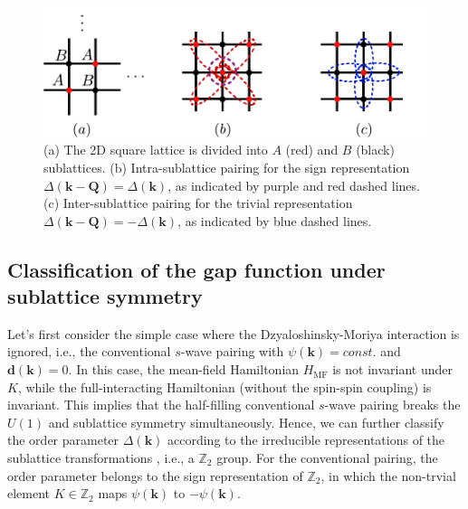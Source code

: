\documentclass[11pt]{article}
\begin{document}
\begin{figure}[H]
\vspace{0.3cm}
  \centering
  \includegraphics[width=\linewidth]{Figures/lattice.pdf}
  \caption{(a) The 2D square lattice is divided into $A$ (red) and $B$ (black) sublattices.
  (b) Intra-sublattice pairing for the sign representation $\Delta(\bm k - \bm Q) = \Delta(\bm k)$,
  as indicated by purple and red dashed lines.
  (c) Inter-sublattice pairing for the trivial representation $\Delta(\bm k - \bm Q) = -\Delta(\bm k)$,
  as indicated by blue dashed lines.}
  \label{fig:lattice}
\vspace{0.3cm}
\end{figure}

\subsection{Classification of the gap function under sublattice symmetry}
Let's first consider the simple case where the Dzyaloshinsky-Moriya interaction is ignored,
i.e., the conventional $s$-wave pairing with $\psi(\bm k) = const.$ and $\bm d(\bm k) = 0$.
In this case, the mean-field Hamiltonian $H_{\mathrm{MF}}$
is not invariant under $K$, while the full-interacting Hamiltonian (without the spin-spin coupling)
is invariant. This implies that the half-filling conventional $s$-wave pairing
breaks the $U(1)$ and sublattice symmetry simultaneously.
Hence, we can further classify the order parameter $\Delta (\bm k)$ according to the irreducible representations
of the sublattice transformations \cite{Landau2013, Manfred_1991}, i.e., a $\mathbb{Z}_2$ group.
For the conventional pairing, the order parameter belongs to the sign representation
of $\mathbb{Z}_2$, in which the non-trvial element $K \in \mathbb{Z}_2$ maps
$\psi(\bm k)$ to $-\psi(\bm k)$.
\end{document}
